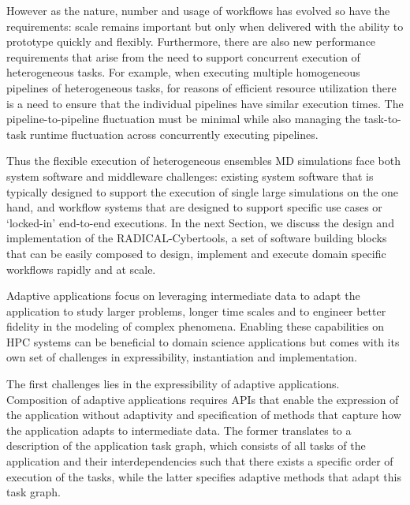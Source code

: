 \documentclass[conference]{IEEEtran}
\begin{document}
However as the nature, number and usage of workflows has evolved so have the
requirements: scale remains important but only when delivered with the
ability to prototype quickly and flexibly. Furthermore, there are also new
performance requirements that arise from the need to support concurrent
execution of heterogeneous tasks. For example, when executing multiple
homogeneous pipelines of heterogeneous tasks, for reasons of efficient
resource utilization there is a need to ensure that the individual pipelines
have similar execution times. The pipeline-to-pipeline fluctuation must be
minimal while also managing the task-to-task runtime fluctuation across
concurrently executing pipelines.


Thus the flexible execution of heterogeneous ensembles MD simulations face
both system software and middleware challenges: existing system software that
is typically designed to support the execution of single large simulations on
the one hand, and workflow systems that are designed to support specific use
cases or `locked-in' end-to-end executions. In the next Section, we discuss
the design and implementation of the RADICAL-Cybertools, a set of software
building blocks that can be easily composed to design, implement and execute
domain specific workflows rapidly and at scale.


Adaptive applications focus on leveraging intermediate data to 
adapt the application to study larger problems, longer time scales and to 
engineer better fidelity in the modeling of complex phenomena. Enabling these
capabilities on HPC systems can be beneficial to domain science applications 
but comes with its own set of challenges in expressibility, instantiation and 
implementation.

The first challenges lies in the expressibility of adaptive applications. 
Composition of adaptive applications requires APIs that enable the expression of
the application without adaptivity and specification of methods that capture how
the application adapts to intermediate data. The former translates to a 
description of the application task graph, which consists of all tasks of the 
application and their interdependencies such that there exists a specific
order of execution of the tasks, while the latter specifies adaptive 
methods that adapt this task graph.
\end{document}
